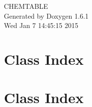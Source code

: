 \documentclass[a4paper]{book}
\begin{document}
\hypersetup{pageanchor=false}
\begin{titlepage}
\vspace*{7cm}
\begin{center}
{\Large CHEMTABLE }\\
\vspace*{1cm}
{\large Generated by Doxygen 1.6.1}\\
\vspace*{0.5cm}
{\small Wed Jan 7 14:45:15 2015}\\
\end{center}
\end{titlepage}
\clearemptydoublepage
{}
\tableofcontents
\clearemptydoublepage
{}
\hypersetup{pageanchor=true}
\chapter{Class Index}

\chapter{Class Index}

\end{document}
